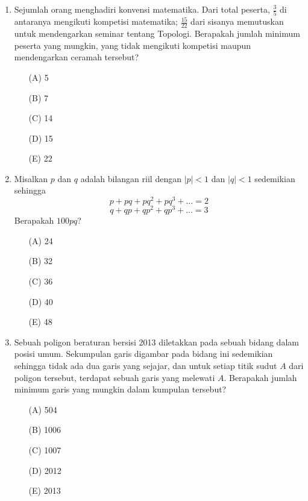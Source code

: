\documentclass[10pt]{article}
\begin{document}
\begin{enumerate}
    \item Sejumlah orang menghadiri konvensi matematika. Dari total peserta, $\frac{3}{5}$ di antaranya mengikuti kompetisi matematika; $\frac{15}{22}$ dari sisanya memutuskan untuk mendengarkan seminar tentang Topologi. Berapakah jumlah minimum peserta yang mungkin, yang tidak mengikuti kompetisi maupun mendengarkan ceramah tersebut?
    \begin{itemize}
        \item[(A)] 5
        \item[(B)] 7
        \item[(C)] 14
        \item[(D)] 15
        \item[(E)] 22
    \end{itemize}

    \item Misalkan $p$ dan $q$ adalah bilangan riil dengan $|p|<1$ dan $|q|<1$ sedemikian sehingga
    \[p+pq+pq^{2}+pq^{3}+\dots=2\]
    \[q+qp+qp^{2}+qp^{3}+\dots=3\]
    Berapakah $100pq$?
    \begin{itemize}
        \item[(A)] 24
        \item[(B)] 32
        \item[(C)] 36
        \item[(D)] 40
        \item[(E)] 48
    \end{itemize}

    \item Sebuah poligon beraturan bersisi 2013 diletakkan pada sebuah bidang dalam posisi umum. Sekumpulan garis digambar pada bidang ini sedemikian sehingga tidak ada dua garis yang sejajar, dan untuk setiap titik sudut $A$ dari poligon tersebut, terdapat sebuah garis yang melewati $A$. Berapakah jumlah minimum garis yang mungkin dalam kumpulan tersebut?
    \begin{itemize}
        \item[(A)] 504
        \item[(B)] 1006
        \item[(C)] 1007
        \item[(D)] 2012
        \item[(E)] 2013
    \end{itemize}


\end{enumerate}
\end{document}
